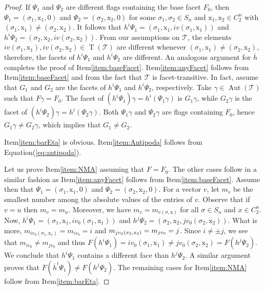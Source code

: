\documentclass[final]{amsart}
\theoremstyle{plain}
\theoremstyle{definition}
\theoremstyle{remark}
\numberwithin{equation}{section}
\renewcommand{\{}{\lbrace}
\renewcommand{\}}{\rbrace}
\renewcommand{\bar}{\overline}
\newcommand{\cT}{\mathcal{T}}
\newcommand{\cyvec}[1]{{\mathrm{#1}}}
\newcommand{\vx}{\cyvec{x}}
\DeclareMathOperator{\aut}{Aut} \DeclareMathOperator{\autp}{\aut^{+}}
\newcommand{\cyctwo}[1][n]{ C_{2}^{#1} }
\DeclareMathOperator{\tras}{T}
\newcommand{\kng}{{h}}
\newcommand{\etab}{\bar{\kng}}
\begin{document}
\begin{proof}
    If $\Psi_1$ and $\Psi_2$ are different flags containing the base facet $F_0$, then $\Psi_1 = (\sigma_{1}, \vx_{1}, 0)$ and $\Psi_{2} = (\sigma_{2}, \vx_{2}, 0)$ for some $\sigma_1, \sigma_{2} \in S_{n}$ and $\vx_{1}, \vx_{2} \in \cyctwo$ with $(\sigma_{1}, \vx_{1}) \neq (\sigma_{2}, \vx_{2})$.
    It follows that $\kng^{i}\Psi_1 = (\sigma_{1}, \vx_{1}, i v(\sigma_{1},\vx_1))$ and
    $\kng^{i}\Psi_{2} = (\sigma_{2}, \vx_{2}, i v(\sigma_{2},\vx_2))$.
    From our assumptions on $\cT$, the elements  $i v(\sigma_{1},\vx_1), i v(\sigma_{2},\vx_2) \in \tras(\cT)$ are different whenever $(\sigma_{1}, \vx_{1}) \neq (\sigma_{2}, \vx_{2})$, therefore, the facets of $\kng^{i}\Psi_{1}$ and $\kng^{i}\Psi_{2}$ are different.
    An analogous argument for $\etab$ completes the proof of Item\nobreakspace \ref {item:baseFacet}.
    Item\nobreakspace \ref {item:anyFacet} follows from Item\nobreakspace \ref {item:baseFacet} and from the fact that $\cT$ is facet-transitive. 
    In fact, assume that $G_1$ and $G_2$ are the facets of $\kng^{i} \Psi_1$ and $\kng^{i}\Psi_2$, respectively.
    Take $\gamma \in \aut(\cT)$ such that $F\gamma = F_0$. 
    The facet of $(\kng^{i} \Psi_1)\gamma = \kng^{i} (\Psi_1 \gamma)$ is $G_1 \gamma$, while $G_2 \gamma$ is the facet of $(\kng^{i} \Psi_2)\gamma = \kng^{i} (\Psi_2 \gamma)$. 
    Both $\Psi_1 \gamma$ and $\Psi_2 \gamma$ are flags containing $F_0$, hence $G_1 \gamma \neq G_2 \gamma$, which implies that $G_1 \neq G_2$.

    Item\nobreakspace \ref {item:barEta} is obvious.  Item\nobreakspace \ref {item:Antipoda} follows from Equation\nobreakspace \textup {(\ref {eq:antipoda})}.

    Let us prove Item\nobreakspace \ref {item:NMA} assuming that $F = F_{0}$.
    The other cases follow in a similar fashion as Item\nobreakspace \ref {item:anyFacet} follows from Item\nobreakspace \ref {item:baseFacet}.
    Assume then that $\Psi_{1} = (\sigma_{1}, \vx_{1}, 0)$ and $\Psi_{2}=(\sigma_{2}, \vx_{2}, 0)$.
    For a vector $v$, let $m_v$ be the smallest number among the absolute values of the entries of $v$.
    Observe that if $v = u$ then $m_v = m_u$. Moreover, we have $m_v = m_{v(\sigma, \vx)}$ for all $\sigma \in S_n$ and $x \in C_2^n$.
    Now, $\kng^{i} \Psi_{1} = (\sigma_{1},\vx_{1},iv_0(\sigma_{1}, \vx_{1}))$ and $\kng^{j} \Psi_{2} = (\sigma_{2},\vx_{2},jv_0(\sigma_{2}, \vx_{2}))$.
    What is more, $m_{iv_0(\sigma_{1}, \vx_{1})} = m_{iv_0} = i$ and $m_{jv_0(\\\sigma_{2},\vx_{2} )} = m_{jv_0} = j$.
    Since $i \neq \pm j$, we see that $m_{iv_0} \neq m_{jv_0}$ and thus $F(\kng^{i} \Psi_{1}) = iv_0(\sigma_{1}, \vx_{1}) \neq jv_0(\sigma_{2}, \vx_{2}) = F(\kng^{j}\Psi_{2})$. We conclude that $\kng^{i} \Psi_{1}$ contains a different face than $\kng^{j} \Psi_{2}$.
    A similar argument proves that  $F(\etab^{i}\Psi_{1}) \neq F(\kng^{j}\Psi_{2})$.
    The remaining cases for Item\nobreakspace \ref {item:NMA} follow from Item\nobreakspace \ref {item:barEta}.


\end{proof}
\end{document}
